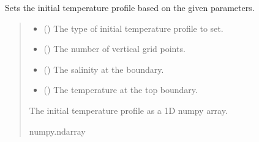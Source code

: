 \documentclass[a4paper,11pt,english,openany]{sphinxmanual}
\begin{document}
\begin{fulllineitems}
\label{\detokenize{api/spyice.preprocess.initial_boundary_conditions:spyice.preprocess.initial_boundary_conditions.set_inital_temperature}}
\pysigstartsignatures
{}
\pysigstopsignatures
\sphinxAtStartPar
Sets the initial temperature profile based on the given parameters.
\begin{quote}\begin{description}
\begin{itemize}
\item {} 
\sphinxAtStartPar
{} () \textendash{} The type of initial temperature profile to set.

\item {} 
\sphinxAtStartPar
{} () \textendash{} The number of vertical grid points.

\item {} 
\sphinxAtStartPar
{} () \textendash{} The salinity at the boundary.

\item {} 
\sphinxAtStartPar
{} () \textendash{} The temperature at the top boundary.

\end{itemize}

\sphinxAtStartPar
The initial temperature profile as a 1D numpy array.

\sphinxAtStartPar
numpy.ndarray

\sphinxAtStartPar
{} \textendash{} 

\end{description}\end{quote}

\end{fulllineitems}
\end{document}
